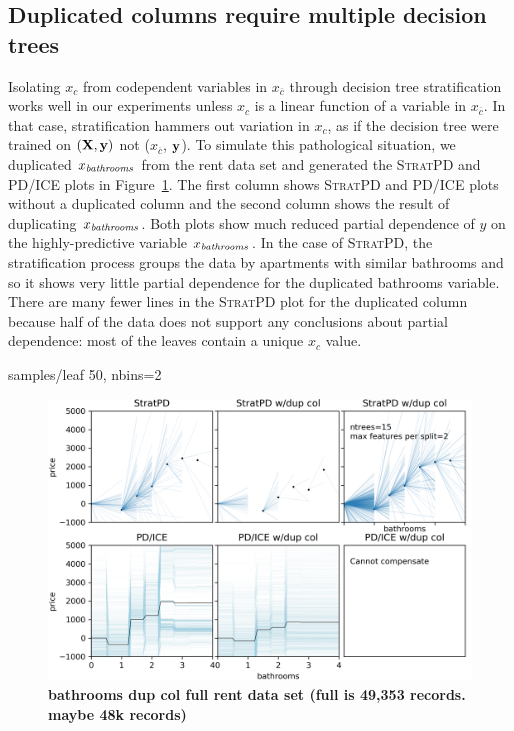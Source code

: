 \documentclass[12pt]{article}
\newcommand{\figref}[1]{Figure~\ref{#1}}
\newcommand{\spd}{\fontfamily{cmr}\textsc{\small StratPD}}
\newcommand{\xnc}{$x_{\overline{c}}$}
\begin{document}
\subsection{Duplicated columns require multiple decision trees}\label{sec:dup}

Isolating $x_c$ from codependent variables in \xnc{} through decision tree stratification works well in our experiments unless $x_c$ is a linear function of a variable in \xnc{}. In that case, stratification hammers out variation in $x_c$, as if the decision tree were trained on $(\bf X, y)$ not (\xnc, $\bf y$). To simulate this pathological situation, we duplicated $x_{\it bathrooms}$ from the rent data set and generated the \spd{} and PD/ICE plots in \figref{fig:baths_dup}. The first column shows \spd{} and PD/ICE plots without a duplicated column and the second column shows the result of duplicating $x_{\it bathrooms}$. Both plots show much reduced partial dependence of $y$ on the highly-predictive variable $x_{\it bathrooms}$. In the case of \spd{}, the stratification process groups the data by apartments with similar bathrooms and so it shows very little partial dependence for the duplicated bathrooms variable.   There are many fewer lines in the \spd{} plot for the duplicated column because half of the data does not support any conclusions about partial dependence: most of the leaves contain a unique $x_c$ value.

samples/leaf 50, nbins=2


\begin{figure}[htbp]
\begin{center}
\includegraphics[scale=0.6]{images/bathrooms_vs_price_dup.png}
\caption{{\bf  bathrooms dup col full rent data set (full is 49,353 records. maybe 48k records)}}
\label{fig:baths_dup}
\end{center}
\end{figure}
\end{document}
